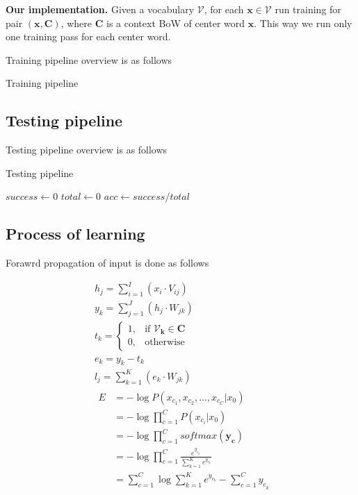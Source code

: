 \documentclass{article}
\newcommand{\SetAlgoStyle}{
	\SetAlgoNoLine
	\SetAlgoNoEnd
	\DontPrintSemicolon
}
\begin{document}
\textbf{Our implementation.}
Given a vocabulary $\mathcal{V}$, for each $\boldsymbol{x} \in \mathcal{V}$ run training for pair $(\boldsymbol{x}, \boldsymbol{C})$, where $\boldsymbol{C}$ is a context BoW of center word $\boldsymbol{x}$. This way we run only one training pass for each center word.

Training pipeline overview is as follows

\begin{algorithm}[H]
	\caption{Training pipeline}
	\SetAlgoStyle
\end{algorithm}

\subsection{Testing pipeline}

Testing pipeline overview is as follows

\begin{algorithm}[H]
	\caption{Testing pipeline}
	\SetAlgoStyle
	$success \gets 0$\;
	$total \gets 0$\;
	$acc \gets success / total$\;
\end{algorithm}

\subsection{Process of learning}

Forawrd propagation of input is done as follows

\begin{align}
	&h_j = \sum_{i=1}^I (x_i \cdot V_{ij}) \\
	&y_k = \sum_{j=1}^J (h_j \cdot W_{jk}) \\
	&t_k =
	\begin{cases}
		1, &\text{if } \boldsymbol{\mathcal{V}_k} \in \boldsymbol{C} \\
		0, &\text{otherwise}
	\end{cases} \\
	&e_k = y_k - t_k \\
	&l_j = \sum_{k=1}^K (e_k \cdot W_{jk}) \\
	&\begin{aligned}
		E &= -\log P(x_{c_1}, x_{c_2},\ldots,x_{c_C}|x_0) \\
		&= -\log \prod_{c=1}^C P(x_{c_i}|x_0) \\
		&= -\log \prod_{c=1}^C softmax(\boldsymbol{y_c}) \\
		&= -\log \prod_{c=1}^C \frac{e^{y_{c_{k^\prime}}}}{\sum_{k=1}^K
		e^{y_{c_k}}} \\
		&= \sum_{c=1}^C \log\sum_{k=1}^K e^{y_{c_k}} - \sum_{c=1}^C
		y_{c_{k^\prime}}
	\end{aligned}
\end{align}
\end{document}
